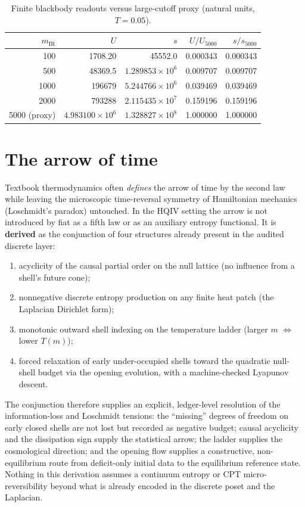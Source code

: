 \documentclass[11pt]{amsart}
\begin{document}
\begin{table}[t]
\centering
\caption{Finite blackbody readouts versus large-cutoff proxy (natural units, $T=0.05$).}
\label{tab:blackbody-convergence}
\begin{tabular}{@{}rrrrr@{}}
\toprule
$m_{\mathrm{IR}}$ & $U$ & $s$ & $U/U_{5000}$ & $s/s_{5000}$ \\
\midrule
100   & 1708.20 & 45552.0 & 0.000343 & 0.000343 \\
500   & 48369.5 & $1.289853\times 10^6$ & 0.009707 & 0.009707 \\
1000  & 196679 & $5.244766\times 10^6$ & 0.039469 & 0.039469 \\
2000  & 793288 & $2.115435\times 10^7$ & 0.159196 & 0.159196 \\
5000 (proxy) & $4.983100\times 10^6$ & $1.328827\times 10^8$ & 1.000000 & 1.000000 \\
\bottomrule
\end{tabular}
\end{table}

\section{The arrow of time}
\label{sec:arrow}

Textbook thermodynamics often \emph{defines} the arrow of time by the second law while
leaving the microscopic time-reversal symmetry of Hamiltonian mechanics (Loschmidt's
paradox) untouched.  In the HQIV setting the arrow is not introduced by fiat as a fifth
law or as an auxiliary entropy functional.  It is \textbf{derived} as the conjunction of
four structures already present in the audited discrete layer:

\begin{enumerate}[leftmargin=2em]
\item acyclicity of the causal partial order on the null lattice (no influence from a
  shell's future cone);
\item nonnegative discrete entropy production on any finite heat patch (the Laplacian
  Dirichlet form);
\item monotonic outward shell indexing on the temperature ladder (larger $m$ $\Leftrightarrow$
  lower $T(m)$);
\item forced relaxation of early under-occupied shells toward the quadratic null-shell
  budget via the opening evolution, with a machine-checked Lyapunov descent.
\end{enumerate}

The conjunction therefore supplies an explicit, ledger-level resolution of the
information-loss and Loschmidt tensions: the ``missing'' degrees of freedom on early
closed shells are not lost but recorded as negative budget; causal acyclicity and the
dissipation sign supply the statistical arrow; the ladder supplies the cosmological
direction; and the opening flow supplies a constructive, non-equilibrium route from
deficit-only initial data to the equilibrium reference state.  Nothing in this
derivation assumes a continuum entropy or CPT micro-reversibility beyond what is
already encoded in the discrete poset and the Laplacian.
\end{document}
